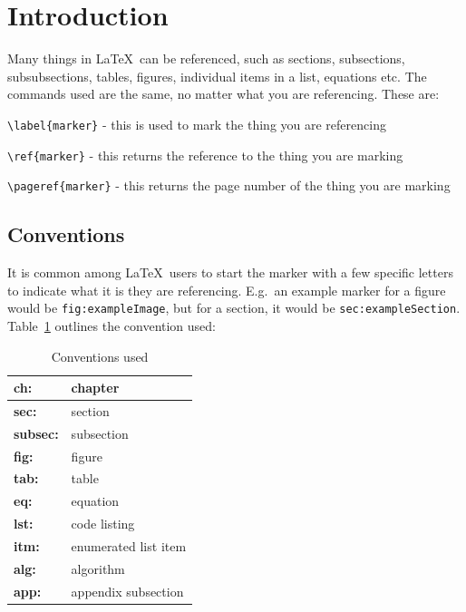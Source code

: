 \documentclass[a4paper,12pt]{article}
\begin{document}
\section{Introduction}
Many things in \LaTeX\ can be referenced, such as sections, subsections, subsubsections, tables, figures, individual items in a list, equations etc. The commands used are the same, no matter what you are referencing. These are:

\verb|\label{marker}| - this is used to mark the thing you are referencing

\verb|\ref{marker}| - this returns the reference to the thing you are marking

\verb|\pageref{marker}| - this returns the page number of the thing you are marking

\subsection{Conventions}
\label{subsec:convention}

It is common among \LaTeX\ users to start the marker with a few specific letters to indicate what it is they are referencing. E.g.\ an example marker for a figure would be \verb|fig:exampleImage|, but for a section, it would be \verb|sec:exampleSection|. Table~\ref{tab:convention} outlines the convention used:

\begin{table}[H]
  \centering
  \begin{tabular}{|l|l|}
    \hline
    {\bf ch:}     & chapter              \\ \hline
    {\bf sec:}    & section              \\ \hline
    {\bf subsec:} & subsection           \\ \hline
    {\bf fig:}    & figure               \\ \hline
    {\bf tab:}    & table                \\ \hline
    {\bf eq:}     & equation             \\ \hline
    {\bf lst:}    & code listing         \\ \hline
    {\bf itm:}    & enumerated list item \\ \hline
    {\bf alg:}    & algorithm            \\ \hline
    {\bf app:}    & appendix subsection  \\ \hline
  \end{tabular}
  \caption{Conventions used}
  \label{tab:convention}
\end{table}
\end{document}

